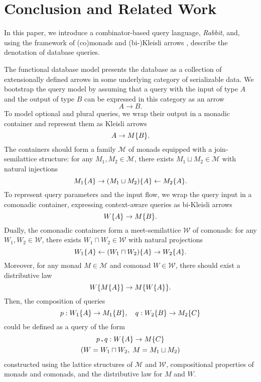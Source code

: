 
\section{Conclusion and Related Work}
\label{sec:conclusion}

In this paper, we introduce a combinator-based query language, \emph{Rabbit},
and, using the framework of (co)monads and (bi-)Kleisli arrows \cite{Moggi1991,
Uustalu2005}, describe the denotation of database queries.

The functional database model presents the database as a collection of
extensionally defined arrows in some underlying category of serializable data.
We bootstrap the query model by assuming that a query with the input of type
$A$ and the output of type $B$ can be expressed in this category as an arrow
\begin{equation*}
    A \to B.
\end{equation*}
To model optional and plural queries, we wrap their output in a monadic
container and represent them as Kleisli arrows
\begin{equation*}
    A \to M{\left\{B\right\}}.
\end{equation*}
The containers should form a family $\mathcal{M}$ of monads equipped with a
join-semilattice structure: for any $M_1, M_2 \in \mathcal{M}$, there exists
$M_1 \sqcup M_2 \in \mathcal{M}$ with natural injections
\begin{equation*}
    M_1{\left\{A\right\}} \rightarrow (M_1 \sqcup M_2){\left\{A\right\}} \leftarrow M_2{\left\{A\right\}}.
\end{equation*}
To represent query parameters and the input flow, we wrap the query input in a
comonadic container, expressing context-aware queries as bi-Kleisli arrows
\begin{equation*}
    W{\left\{A\right\}} \to M{\left\{B\right\}}.
\end{equation*}
Dually, the comonadic containers form a meet-semi\-lat\-tice $\mathcal{W}$ of
comonads: for any $W_1, W_2 \in \mathcal{W}$, there exists
$W_1 \sqcap W_2 \in \mathcal{W}$ with natural projections
\begin{equation*}
    W_1{\left\{A\right\}} \leftarrow (W_1 \sqcap W_2)\{A\} \rightarrow W_2{\left\{A\right\}}.
\end{equation*}
Moreover, for any monad $M\in\mathcal{M}$ and comonad $W\in\mathcal{W}$, there
should exist a distributive law
\begin{equation*}
    W{\left\{M{\left\{A\right\}}\right\}} \to M{\left\{W{\left\{A\right\}}\right\}}.
\end{equation*}
Then, the composition of queries
\begin{equation*}
    p : W_1{\left\{A\right\}} \to M_1{\left\{B\right\}}, \quad q : W_2{\left\{B\right\}} \to M_2{\left\{C\right\}}
\end{equation*}
could be defined as a query of the form
\begin{multline*}
    p\,\boldsymbol{.}\,q : W{\left\{A\right\}} \to M{\left\{C\right\}} \\ (W = W_1 \sqcap W_2,\; M = M_1 \sqcup M_2)
\end{multline*}
constructed using the lattice structures of $\mathcal{M}$ and $\mathcal{W}$,
compositional properties of monads and comonads, and the distributive law for
$M$ and $W$.

